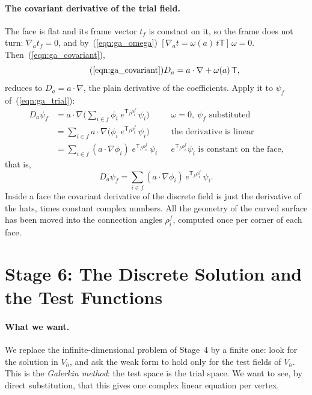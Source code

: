 \paragraph{The covariant derivative of the trial field.} The face is flat and its frame vector $t_f$ is constant on it, so the frame does not turn: $\nabla_a t_f = 0$, and by~(\ref{eqn:ga_omega})~[\,$\nabla_a t = \omega(a)\, t\mathsf T$\,] $\omega = 0$. Then~(\ref{eqn:ga_covariant}),
\begin{equation*}
\tag{\ref{eqn:ga_covariant}}
D_a = a\cdot\nabla + \omega(a)\,\mathsf T ,
\end{equation*}
reduces to $D_a = a\cdot\nabla$, the plain derivative of the coefficients. Apply it to $\psi_f$ of~(\ref{eqn:ga_trial}):
\begin{align*}
D_a\psi_f &= a\cdot\nabla\Big(\sum_{i \in f} \phi_i\; e^{\mathsf T_f \rho_i^f}\, \psi_i\Big) && \omega = 0,\ \psi_f \text{ substituted} \\
&= \sum_{i\in f} a\cdot\nabla\big(\phi_i\; e^{\mathsf T_f \rho_i^f}\, \psi_i\big) && \text{the derivative is linear} \\
&= \sum_{i\in f} (a\cdot\nabla\phi_i)\; e^{\mathsf T_f \rho_i^f}\, \psi_i && e^{\mathsf T_f\rho_i^f}\psi_i \text{ is constant on the face,}
\end{align*}
that is,
\begin{equation}
\label{eqn:ga_grad_trial}
D_a \psi_f = \sum_{i \in f} (a \cdot \nabla \phi_i)\, e^{\mathsf T_f \rho_i^f}\, \psi_i .
\end{equation}
Inside a face the covariant derivative of the discrete field is just the derivative of the hats, times constant complex numbers. All the geometry of the curved surface has been moved into the connection angles $\rho_i^f$, computed once per corner of each face.

\section{Stage 6: The Discrete Solution and the Test Functions}
\label{section:r2_stage6}

\paragraph{What we want.} We replace the infinite-dimensional problem of Stage~4 by a finite one: look for the solution in $V_h$, and ask the weak form to hold only for the test fields of $V_h$. This is the \emph{Galerkin method}: the test space is the trial space. We want to see, by direct substitution, that this gives one complex linear equation per vertex.

